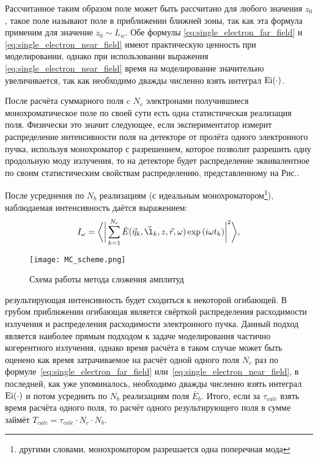 Рассчитанное таким образом поле может быть рассчитано для любого значения $z_0$, такое поле называют поле в приближении ближней зоны, так как эта формула применим для значение $z_0 \sim L_w$. Обе формулы \ref{eq:single_electron_far_field} и \ref{eq:single_electron_near_field} имеют практическую ценность при моделировании, однако при использовании выражения \ref{eq:single_electron_near_field} время на моделирование значительно увеличивается, так как необходимо дважды численно взять интеграл $\textup{Ei}(\cdot)$.
 
После расчёта суммарного поля c $N_e$ электронами получившиеся монохроматическое поле по своей сути есть одна статистическая реализация поля.  Физически это значит следующее, если экспериментатор измерит распределение интенсивности поля на детекторе от пролёта одного электронного пучка, используя монохроматор с разрешением, которое позволит разрешить одну продольную моду излучения, то на детекторе будет распределение эквивалентное по своим статистическим свойствам распределению, представленному на Рис.. 

После усреднения по $N_b$ реализациям (с идеальным монохроматором\footnote{другими словами, монохроматором разрешается одна поперечная мода}), наблюдаемая интенсивность даётся выражением: 
\begin{align}
	I_{\omega} = \bigg \langle \bigg|\sum\limits_{k=1}^{N_e} \bar{E}(\vec{\eta}_k, \vec{\l}_k, z, \vec{r}, \omega) \exp{(i \omega t_k)}\bigg|^2 \bigg \rangle,
	\label{eq:I_MC} 
\end{align}
\begin{figure}[H] 
	\centering 	\texttt{[image: MC\_scheme.png]}
	\caption{Схема работы метода сложения амплитуд}
	\label{fig:SRW_scheme}
\end{figure}
\noindent результирующая интенсивность будет сходиться к некоторой огибающей. В грубом приближении огибающая является свёрткой распределения расходимости излучения и распределения расходимости электронного пучка. Данный подход является наиболее прямым подходом к задаче моделирования частично когерентного излучения, однако время расчёта в таком случае может быть оценено как время затрачиваемое на расчёт одной одного поля $N_e$ раз по формуле~\ref{eq:single_electron_far_field} или~\ref{eq:single_electron_near_field}, в последней, как уже упоминалось, необходимо дважды численно взять интеграл $\textup{Ei}(\cdot)$ и потом усреднить по $N_b$ реализациям поля $\bar{E}_{b}$. Итого, если за $\tau_{calc}$ взять время расчёта одного поля, то расчёт одного результирующего поля в сумме займёт $T_{calc} = \tau_{calc} \cdot N_e \cdot N_b$.

